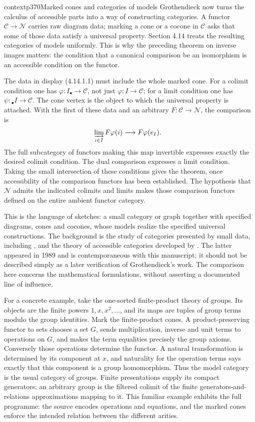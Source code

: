 \begin{dcomment}{context}{p370}{Marked cones and categories of models}
Grothendieck now turns the calculus of accessible parts into a way of constructing categories. A functor $\mathcal C\to\mathcal N$ carries raw diagram data; marking a cone or a cocone in $\mathcal C$ asks that some of those data satisfy a universal property. Section 4.14 treats the resulting categories of models uniformly. This is why the preceding theorem on inverse images matters: the condition that a canonical comparison be an isomorphism is an accessible condition on the functor.

The data in display (4.14.1.1) must include the whole marked cone. For a colimit condition one has $\varphi:I_\bullet\to\mathcal C$, not just $\varphi:I\to\mathcal C$; for a limit condition one has $\psi:{}_\bullet I\to\mathcal C$. The cone vertex is the object to which the universal property is attached. With the first of these data and an arbitrary $F:\mathcal C\to\mathcal N$, the comparison is
\[
 \varinjlim_{i\in I}F\varphi(i)\longrightarrow F\varphi(e_I).
\]
The full subcategory of functors making this map invertible expresses exactly the desired colimit condition. The dual comparison expresses a limit condition. Taking the small intersection of these conditions gives the theorem, once accessibility of the comparison functors has been established. The hypothesis that $\mathcal N$ admits the indicated colimits and limits makes those comparison functors defined on the entire ambient functor category.

This is the language of sketches: a small category or graph together with specified diagrams, cones and cocones, whose models realize the specified universal constructions. The background is the study of categories presented by small data, including \citet{GabrielUlmer1971}, and the theory of accessible categories developed by \citet{MakkaiPare1989}. The latter appeared in 1989 and is contemporaneous with this manuscript; it should not be described simply as a later verification of Grothendieck's work. The comparison here concerns the mathematical formulations, without asserting a documented line of influence.

For a concrete example, take the one-sorted finite-product theory of groups. Its objects are the finite powers $1,x,x^2,\ldots$, and its maps are tuples of group terms modulo the group identities. Mark the finite-product cones. A product-preserving functor to sets chooses a set $G$, sends multiplication, inverse and unit terms to operations on $G$, and makes the term equalities precisely the group axioms. Conversely those operations determine the functor. A natural transformation is determined by its component at $x$, and naturality for the operation terms says exactly that this component is a group homomorphism. Thus the model category is the usual category of groups. Finite presentations supply its compact generators; an arbitrary group is the filtered colimit of the finite generators-and-relations approximations mapping to it. This familiar example exhibits the full programme: the source encodes operations and equations, and the marked cones enforce the intended relation between the different arities.


\end{dcomment}
